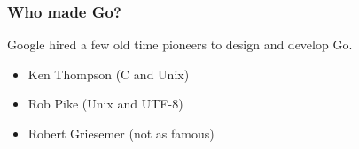 \documentclass{beamer}
\begin{document}
\begin{frame}
  \frametitle{Who made Go?}

  Google hired a few old time pioneers to design and develop Go.
  
  \begin{itemize}
    \item Ken Thompson (C and Unix)
    \item Rob Pike (Unix and UTF-8)
    \item Robert Griesemer (not as famous)
  \end{itemize}
\end{frame}
\end{document}
